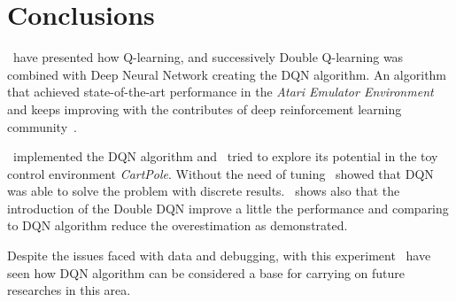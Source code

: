 \section{Conclusions}

\Auth~have presented how Q-learning, and successively Double Q-learning was combined with Deep Neural Network creating the DQN algorithm. 
An algorithm that achieved state-of-the-art performance in the \textit{Atari Emulator Environment} and keeps improving with the contributes of deep reinforcement learning community~\cite{DBLP:journals/corr/abs-1710-02298}.

\Auth~implemented the DQN algorithm and \auth~tried to explore its potential in the toy control environment \textit{CartPole}. Without the need of tuning \auth~showed that DQN was able to solve the problem with discrete results. \Auth~shows also that the introduction of the Double DQN improve a little the performance and comparing to DQN algorithm reduce the overestimation as \citeauthor{Hasselt:2016:DRL:3016100.3016191}  demonstrated.

Despite the issues faced with data and debugging, with this experiment \auth~have seen how DQN algorithm can be considered a base for carrying on future researches in this area. 